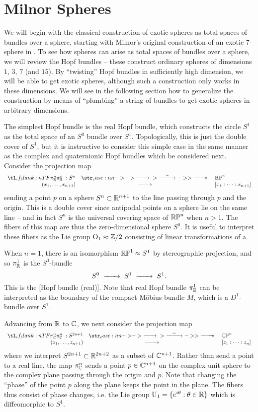 \pagebreak
\section{Milnor Spheres}\label{sec:milnor-spheres}

We will begin with the classical construction of exotic spheres as total spaces of bundles over a sphere, starting with Milnor's original construction of an exotic 7-sphere in \cite{milnor1956manifolds}.
To see how spheres can arise as total spaces of bundles over a sphere, we will review the Hopf bundles -- these construct ordinary spheres of dimensions $1$, $3$, $7$ (and $15$). By ``twisting'' Hopf bundles in sufficiently high dimension, we will be able to get exotic spheres, although such a construction only works in these dimensions. We will see in the following section how to generalize the construction by means of ``plumbing'' a string of bundles to get exotic spheres in arbitrary dimensions.

The simplest Hopf bundle is the real Hopf bundle, which constructs the circle $S^1$ as the total space of an $S^0$ bundle over $S^1$. Topologically, this is just the double cover of $S^1$, but it is instructive to consider this simple case in the same manner as the complex and quaternionic Hopf bundles which be considered next.
Consider the projection map
\[
	\lkxfunc{\pi_\R^n}{S^n}{\RP^n}{(x_1,\ldots, x_{n+1})}{[x_1:\cdots: x_{n+1}]}
\]
sending a point $p$ on a sphere $S^n\subset \mathbb{R}^{n+1}$ to the line passing through $p$ and the origin. This is a double cover since antipodal points on a sphere lie on the same line -- and in fact $S^n$ is the universal covering space of $\mathbb{RP}^n$ when $n>1$. The fibers of this map are thus the zero-dimensional sphere $S^0$. It is useful to interpret these fibers as the Lie group $\mathrm{O}_1\approx \mathbb{Z}/2$ consisting of linear transformations of a

When $n=1$, there is an isomorphism $\mathbb{RP}^1\approx S^1$ by stereographic projection, and so $\pi_{\mathbb{R}}^1$ is the $S^0$-bundle
\[
	S^0 \lkxto S^1\lkxto S^1.
\]
This is the [Hopf bundle (real)].
Note that real Hopf bundle $\pi_{\mathbb{R}}^1$ can be interpreted as the boundary of the compact M\"obius bundle $M$, which is a $D^1$-bundle over $S^1$.

Advancing from $\mathbb{R}$ to $\mathbb{C}$, we next consider the projection map
\[
	\lkxfunc{\pi_\C^n}{S^{2n+1}}{\CP^n}{(z_1,\ldots, z_{n+1})}{[z_1:\cdots: z_n]}
\]
where we interpret $S^{2n+1}\subset \mathbb{R}^{2n+2}$ as a subset of $\mathbb{C}^{n+1}$. Rather than send a point to a real line, the map $\pi_{\mathbb{C}}^n$ sends a point $p\in \mathbb{C}^{n+1}$ on the complex unit sphere to the complex plane passing through the origin and $p$. Note that changing the ``phase'' of the point $p$ along the plane keeps the point in the plane. The fibers thus consist of phase changes, i.e. the Lie group $\mathrm{U}_1=\{e^{i\theta} : \theta\in \mathbb{R}\}$ which is diffeomorphic to $S^1$.

